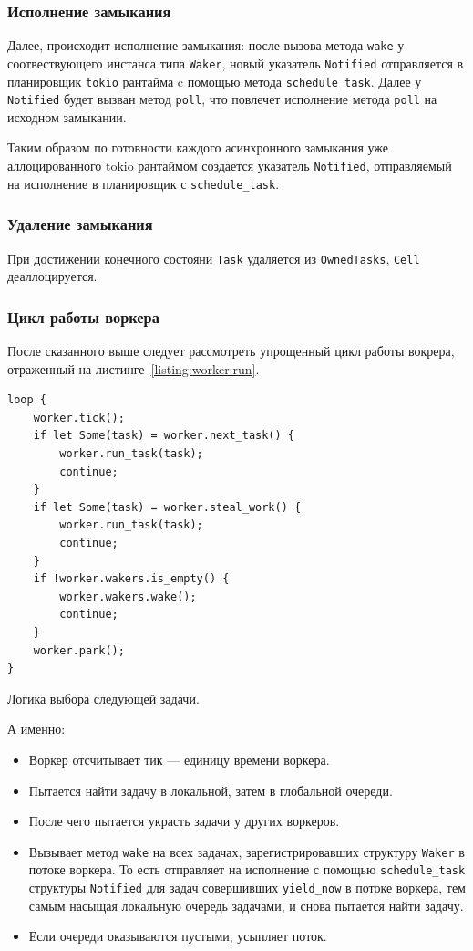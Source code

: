 \subsubsection{Исполнение замыкания}

Далее, происходит исполнение замыкания: после вызова метода \verb|wake| у соотвествующего инстанса типа \verb|Waker|, новый указатель \verb|Notified| отправляется в планировщик \verb|tokio| рантайма c помощью метода \verb|schedule_task|. Далее у \verb|Notified| будет вызван метод \verb|poll|, что повлечет исполнение метода \verb|poll| на исходном замыкании.

Таким образом по готовности каждого асинхронного замыкания уже аллоцированного tokio рантаймом создается указатель \verb|Notified|, отправляемый на исполнение в планировщик с \verb|schedule_task|.

\subsubsection{Удаление замыкания}

При достижении конечного состояни \verb|Task| удаляется из \verb|OwnedTasks|, \verb|Cell| деаллоцируется.

\subsubsection{Цикл работы воркера}

После сказанного выше следует рассмотреть упрощенный цикл работы вокрера, отраженный на листинге~\ref{listing:worker:run}.

\begin{listing}[H]
    \begin{verbatim}
loop {
    worker.tick();
    if let Some(task) = worker.next_task() {
        worker.run_task(task);
        continue;
    }
    if let Some(task) = worker.steal_work() {
        worker.run_task(task);
        continue;
    }
    if !worker.wakers.is_empty() {
        worker.wakers.wake();
        continue;
    }
    worker.park();
}
    \end{verbatim}

    \caption{Логика выбора следующей задачи.}
    \label{listing:worker:run}
\end{listing}

А именно:

\begin{itemize}
    \item Воркер отсчитывает тик --- единицу времени воркера.
    \item Пытается найти задачу в локальной, затем в глобальной очереди.
    \item После чего пытается украсть задачи у других воркеров.
    \item Вызывает метод \verb|wake| на всех задачах, зарегистрировавших структуру \verb|Waker| в потоке воркера. То есть отправляет на исполнение с помощью \verb|schedule_task| структуры \verb|Notified| для задач совершивших \verb|yield_now| в потоке воркера, тем самым насыщая локальную очередь задачами, и снова пытается найти задачу.
    \item Если очереди оказываются пустыми, усыпляет поток.
\end{itemize}

